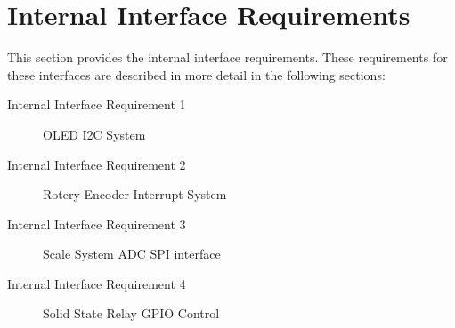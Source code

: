 \KNEADSECTIONNEWPAGE
\section{Internal Interface Requirements}
\label{lab:sec_InternalInterfaceRequirements}



This section provides the internal interface requirements.
These requirements for these interfaces are described in more detail in the following sections:
\begin{description}
	\item[Internal Interface Requirement 1] OLED I2C System%
	\item[Internal Interface Requirement 2] Rotery Encoder Interrupt System%
	\item[Internal Interface Requirement 3] Scale System ADC SPI interface%
	\item[Internal Interface Requirement 4] Solid State Relay GPIO Control%

\end{description}


